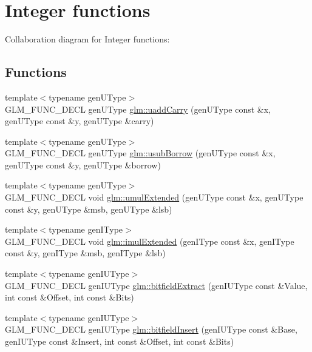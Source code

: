 \hypertarget{group__core__func__integer}{
\section{Integer functions}
\label{group__core__func__integer}
}


Collaboration diagram for Integer functions:\subsection*{Functions}
\begin{CompactItemize}
\item 
{\footnotesize template$<$typename genUType$>$ }\\GLM\_\-FUNC\_\-DECL genUType \hyperlink{group__core__func__integer_gcb5031847f80c2e28151a687e57bd4b8}{glm::uaddCarry} (genUType const \&x, genUType const \&y, genUType \&carry)
\item 
{\footnotesize template$<$typename genUType$>$ }\\GLM\_\-FUNC\_\-DECL genUType \hyperlink{group__core__func__integer_ge13e6c290847ba577bdd0b82b2527ce2}{glm::usubBorrow} (genUType const \&x, genUType const \&y, genUType \&borrow)
\item 
{\footnotesize template$<$typename genUType$>$ }\\GLM\_\-FUNC\_\-DECL void \hyperlink{group__core__func__integer_g74e6492619a6a79d3130b56f7b6eb6a8}{glm::umulExtended} (genUType const \&x, genUType const \&y, genUType \&msb, genUType \&lsb)
\item 
{\footnotesize template$<$typename genIType$>$ }\\GLM\_\-FUNC\_\-DECL void \hyperlink{group__core__func__integer_g2f837b25b019b4dfacc4091a3a45c4b9}{glm::imulExtended} (genIType const \&x, genIType const \&y, genIType \&msb, genIType \&lsb)
\item 
{\footnotesize template$<$typename genIUType$>$ }\\GLM\_\-FUNC\_\-DECL genIUType \hyperlink{group__core__func__integer_gcd29b1963983f03da4de38aaffac6dbd}{glm::bitfieldExtract} (genIUType const \&Value, int const \&Offset, int const \&Bits)
\item 
{\footnotesize template$<$typename genIUType$>$ }\\GLM\_\-FUNC\_\-DECL genIUType \hyperlink{group__core__func__integer_g33b112990d40ef4c8bf91591dc7d9cd9}{glm::bitfieldInsert} (genIUType const \&Base, genIUType const \&Insert, int const \&Offset, int const \&Bits)

\end{CompactItemize}
